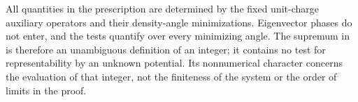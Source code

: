 All quantities in the prescription are determined by the fixed
unit-charge auxiliary operators and their density-angle
minimizations.  Eigenvector phases do not enter, and the tests
quantify over every minimizing angle.  The supremum in
 is therefore an unambiguous definition
of an integer; it contains no test for representability by an
unknown potential.  Its nonnumerical character concerns the
evaluation of that integer, not the finiteness of the system or
the order of limits in the proof.
